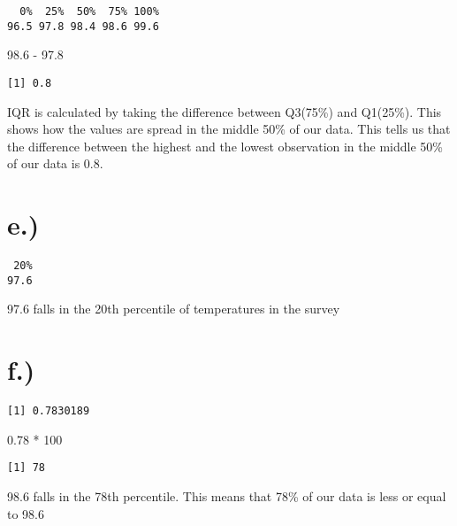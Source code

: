 \documentclass[
  letterpaper,
  DIV=11,
  numbers=noendperiod]{scrartcl}
\newenvironment{Shaded}{\begin{snugshade}}{\end{snugshade}}
\newcommand{\DecValTok}[1]{\textcolor[rgb]{0.68,0.00,0.00}{#1}}
\newcommand{\FloatTok}[1]{\textcolor[rgb]{0.68,0.00,0.00}{#1}}
\newcommand{\FunctionTok}[1]{\textcolor[rgb]{0.28,0.35,0.67}{#1}}
\newcommand{\NormalTok}[1]{\textcolor[rgb]{0.00,0.23,0.31}{#1}}
\newcommand{\SpecialCharTok}[1]{\textcolor[rgb]{0.37,0.37,0.37}{#1}}
\begin{document}
\begin{verbatim}
  0%  25%  50%  75% 100% 
96.5 97.8 98.4 98.6 99.6 
\end{verbatim}

\begin{Shaded}
\begin{Highlighting}[]
\FloatTok{98.6} \SpecialCharTok{{-}} \FloatTok{97.8}
\end{Highlighting}
\end{Shaded}

\begin{verbatim}
[1] 0.8
\end{verbatim}

IQR is calculated by taking the difference between Q3(75\%) and
Q1(25\%). This shows how the values are spread in the middle 50\% of our
data. This tells us that the difference between the highest and the
lowest observation in the middle 50\% of our data is 0.8.

\section{e.)}\label{e.}

\begin{Shaded}
\end{Shaded}

\begin{verbatim}
 20% 
97.6 
\end{verbatim}

97.6 falls in the 20th percentile of temperatures in the survey

\section{f.)}\label{f.}

\begin{Shaded}
\end{Shaded}

\begin{verbatim}
[1] 0.7830189
\end{verbatim}

\begin{Shaded}
\begin{Highlighting}[]
\FloatTok{0.78} \SpecialCharTok{*} \DecValTok{100}
\end{Highlighting}
\end{Shaded}

\begin{verbatim}
[1] 78
\end{verbatim}

98.6 falls in the 78th percentile. This means that 78\% of our data is
less or equal to 98.6
\end{document}
